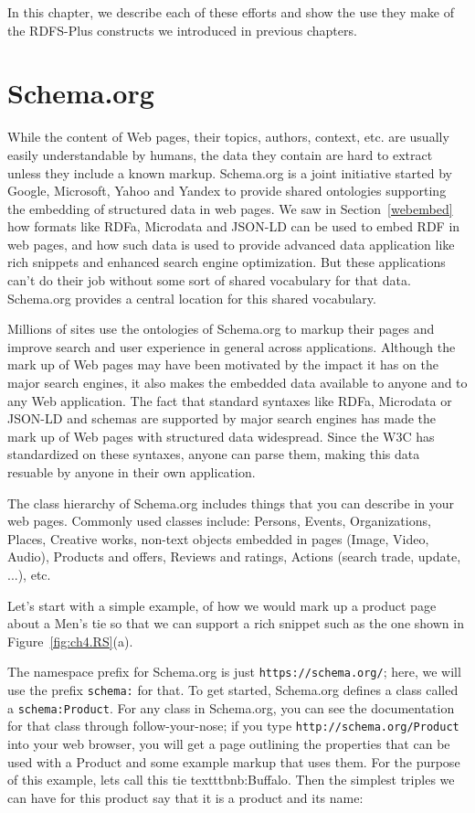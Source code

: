 In this chapter, we describe each of these efforts and show the use they
make of the RDFS-Plus constructs we introduced in previous chapters.

\section{Schema.org}
\label{schema.org}
While the content of Web pages, their topics, authors, context, etc. are usually easily 
understandable by humans, the data they contain are hard to extract unless they include a 
known markup. Schema.org is a joint initiative started by Google, Microsoft, Yahoo and 
Yandex to provide shared ontologies supporting the embedding of structured data in web 
pages. We saw in Section~\ref{webembed} how formats like RDFa, Microdata and JSON-LD can 
be used to embed RDF in web pages, and how such data is used to provide
advanced data application like rich snippets and enhanced search engine optimization. 
But these applications can't do their job without some sort of shared vocabulary 
for that data.  Schema.org provides a central location for this shared vocabulary. 

Millions of sites use the ontologies of Schema.org to markup their pages and improve search and user experience in general across applications. Although the mark up of Web pages may have been motivated by the impact it has on the major search engines, it also makes the embedded data available to anyone and to any Web application. The fact that standard syntaxes like RDFa, Microdata or JSON-LD and schemas are supported by major search engines has made the mark up of Web pages with structured data  widespread.  Since the W3C has standardized on these
syntaxes, anyone can parse them, making this data resuable by anyone in their own application. 


The class hierarchy of Schema.org includes things that you can describe in 
your web pages. 
Commonly used classes include: Persons, Events, Organizations, Places, Creative works, non-text objects embedded in pages (Image, Video, Audio), Products and offers, Reviews and ratings, Actions (search trade, update, ...), etc.

Let's start with a simple example, of how we would mark up a product page about 
a Men's tie so that we can support a rich snippet such as the one shown in Figure~\ref{fig:ch4.RS}(a).

The namespace prefix for Schema.org is just \texttt{https://schema.org/}; here, we will 
use the prefix \texttt{schema:} for that.  To get started,  Schema.org defines a class called a \texttt{schema:Product}.  For any class in Schema.org, you can see the 
documentation for that class through follow-your-nose; if you type \texttt{http://schema.org/Product} into your web browser, you will get a page outlining
the properties that can be used with a Product and some example markup that uses them. 
For the purpose of this example, lets call this tie texttt{bnb:Buffalo}.  Then 
the simplest triples we can have for this product say that it is a product and its 
name:

